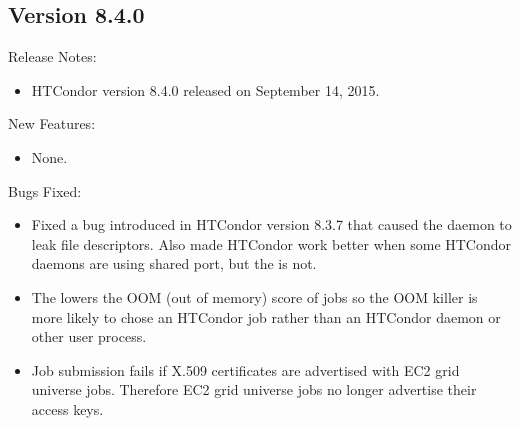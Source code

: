 \subsection*{\label{sec:New-8-4-0}Version 8.4.0}

\noindent Release Notes:

\begin{itemize}

\item HTCondor version 8.4.0 released on September 14, 2015.

\end{itemize}


\noindent New Features:

\begin{itemize}

\item None.

\end{itemize}

\noindent Bugs Fixed:

\begin{itemize}

\item Fixed a bug introduced in HTCondor version 8.3.7 that caused the
 daemon to leak file descriptors.
Also made HTCondor work better when some HTCondor daemons
are using shared port, but the  is not.

\item The  lowers the OOM (out of memory) score of jobs
so the OOM killer is more likely to chose an HTCondor job rather than
an HTCondor daemon or other user process.

\item Job submission fails if X.509 certificates are advertised with EC2 
grid universe jobs.
Therefore EC2 grid universe jobs no longer advertise their access keys.

\end{itemize}

